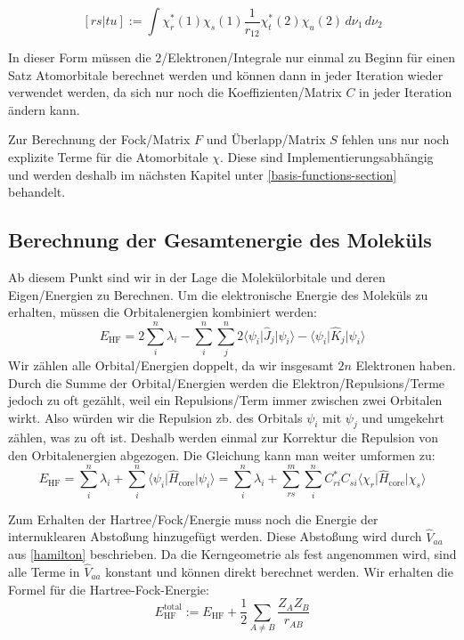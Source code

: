 \begin{equation}\label{2e-integral-ao}
    [rs\vert tu] := 
    \int \chi_r^*(1) \chi_s(1) \frac{1}{r_{12}} \chi_t^*(2) \chi_u(2) \,d\nu _1 \,d\nu_2
\end{equation}

In dieser Form müssen die 2\-/Elektronen\-/Integrale nur einmal
zu Beginn für einen Satz Atomorbitale berechnet werden und
können dann in jeder Iteration wieder verwendet werden,
da sich nur noch die Koeffizienten\-/Matrix $C$ in jeder Iteration ändern kann.

Zur Berechnung der Fock\-/Matrix $F$ und Überlapp\-/Matrix $S$
fehlen uns nur noch explizite Terme für die Atomorbitale $\chi$.
Diese sind Implementierungsabhängig und werden deshalb im nächsten Kapitel
unter \cref{basis-functions-section} behandelt.

\cite[5.2.3.6.3]{lewars_2016}
\cite[3.4.4]{szabo_ostlund_1996}

\subsection{Berechnung der Gesamtenergie des Moleküls}
Ab diesem Punkt sind wir in der Lage die Molekülorbitale und
deren Eigen\-/Energien zu Berechnen. Um die elektronische Energie des Moleküls zu erhalten,
müssen die Orbitalenergien kombiniert werden:
\begin{equation}
    E_{\text{HF}} = 2 \sum_i^n \lambda_i - \sum_i^n \sum_j^n
    2 \langle \psi_i \vert \hat{J}_j \vert \psi_i \rangle
    - \langle \psi_i \vert \hat{K}_j \vert \psi_i \rangle
\end{equation}
Wir zählen alle Orbital\-/Energien doppelt, da wir insgesamt $2n$ Elektronen haben.
Durch die Summe der Orbital\-/Energien werden die Elektron\-/Repulsions\-/Terme
jedoch zu oft gezählt, weil ein Repulsions\-/Term immer zwischen zwei Orbitalen wirkt.
Also würden wir die Repulsion zb. des Orbitals $\psi_i$ mit $\psi_j$ und umgekehrt zählen,
was zu oft ist.
Deshalb werden einmal zur Korrektur die Repulsion von den Orbitalenergien abgezogen.
Die Gleichung kann man weiter umformen zu:
\begin{equation}
    E_{\text{HF}} = \sum_i^n \lambda_i
    + \sum_i^n \langle \psi_i \vert \hat{H}_{\text{core}} \vert \psi_i \rangle
    = \sum_i^n \lambda_i
    + \sum_{rs}^m \sum_i^{n} C_{ri}^*C_{si}
    \langle \chi_r \vert \hat{H}_{\text{core}} \vert \chi_s \rangle
\end{equation}

Zum Erhalten der Hartree\-/Fock\-/Energie muss noch die Energie
der internuklearen Abstoßung hinzugefügt werden.
Diese Abstoßung wird durch $\hat{V}_{aa}$ aus \cref*{hamilton} beschrieben.
Da die Kerngeometrie als fest angenommen wird, sind alle Terme in $\hat{V}_{aa}$ konstant
und können direkt berechnet werden. Wir erhalten die Formel für die Hartree-Fock-Energie:
\begin{equation}
    E_{\text{HF}}^{\text{total}} := E_{\text{HF}} + \frac{1}{2}\sum_{A \neq B } \frac{Z_A Z_B}{r_{AB}}
\end{equation}

\cite[S. 229-231]{lewars_2016}



